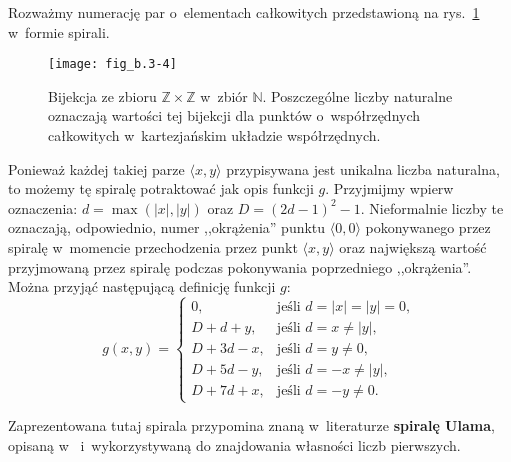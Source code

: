 Rozważmy numerację par o~elementach całkowitych przedstawioną na rys.\ \ref{fig:B.3-4} w~formie spirali.
\begin{figure}[ht]
	\begin{center}
		\texttt{[image: fig\_b.3-4]}
	\end{center}
	\caption{Bijekcja ze zbioru $\mathbb{Z}\times\mathbb{Z}$ w~zbiór $\mathbb{N}$.
	Poszczególne liczby naturalne oznaczają wartości tej bijekcji dla punktów o~współrzędnych całkowitych w~kartezjańskim układzie współrzędnych.} \label{fig:B.3-4}
\end{figure}
Ponieważ każdej takiej parze $\langle x,y\rangle$ przypisywana jest unikalna liczba naturalna, to możemy tę spiralę potraktować jak opis funkcji $g$.
Przyjmijmy wpierw oznaczenia: $d=\max(|x|,|y|)$ oraz $D=(2d-1)^2-1$.
Nieformalnie liczby te oznaczają, odpowiednio, numer ,,okrążenia'' punktu $\langle0,0\rangle$ pokonywanego przez spiralę w~momencie przechodzenia przez punkt $\langle x,y\rangle$ oraz największą wartość przyjmowaną przez spiralę podczas pokonywania poprzedniego ,,okrążenia''.
Można przyjąć następującą definicję funkcji $g$:
\[
	g(x,y) =
	\begin{cases}
		0, & \text{jeśli $d=|x|=|y|=0$}, \\
		D+d+y, & \text{jeśli $d=x\ne|y|$}, \\
		D+3d-x, & \text{jeśli $d=y\ne0$}, \\
		D+5d-y, & \text{jeśli $d=-x\ne|y|$}, \\
		D+7d+x, & \text{jeśli $d=-y\ne0$}.
	\end{cases}
\]

Zaprezentowana tutaj spirala przypomina znaną w~literaturze \textbf{spiralę Ulama}, opisaną w~\cite{ulamspiral} i~wykorzystywaną do znajdowania własności liczb pierwszych.
